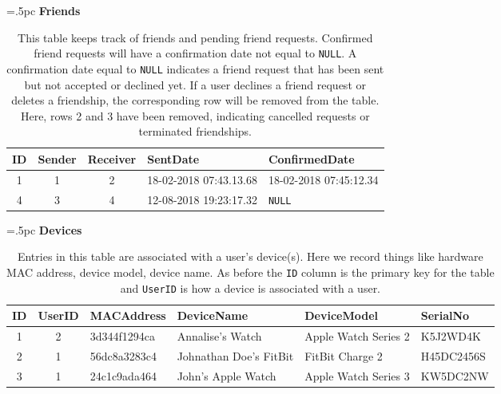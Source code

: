 \documentclass{article}
\theoremstyle{definition}
\begin{document}
\begin{table}[H]
	\centering
	\tabcolsep=.5pc
	{\bf Friends}
	
	\begin{tabular}{cccll} \hline 
		ID & Sender & Receiver & SentDate & ConfirmedDate \\ \hline 
		1 & 1 & 2 & 18-02-2018 07:43.13.68 & 18-02-2018 07:45:12.34 \\
		4 & 3 & 4 & 12-08-2018 19:23:17.32 & {\tt NULL} \\
		\hline 
	\end{tabular}
	\caption{\label{tab:friends}
		This table keeps track of friends and pending friend requests. Confirmed friend requests will have a confirmation date not equal to {\tt NULL}. A confirmation date equal to {\tt NULL} indicates a friend request that has been sent but not accepted or declined yet. If a user declines a friend request or deletes a friendship, the corresponding row will be removed from the table. Here, rows 2 and 3 have been removed, indicating cancelled requests or terminated friendships.
	}
\end{table}

\begin{sidewaystable}[h]
	\centering
	\tabcolsep=.5pc
	{\bf Devices}
	
	\begin{tabular}{ccllll} \hline 
		ID & UserID & MACAddress & DeviceName & DeviceModel & SerialNo \\ \hline  
		1 & 2 & 3d344f1294ca & Annalise's Watch & Apple Watch Series 2 & K5J2WD4K \\
		2 & 1 & 56dc8a3283c4 & Johnathan Doe's FitBit & FitBit Charge 2 & H45DC2456S \\
		3 & 1 & 24c1c9ada464 & John's Apple Watch & Apple Watch Series 3 & KW5DC2NW \\ 
		\hline 
	\end{tabular}
	\caption{\label{tab:device}
		Entries in this table are associated with a user's device(s). Here we record things like hardware MAC address, device model, device name. As before the {\tt ID} column is the primary key for the table and {\tt UserID} is how a device is associated with a user. 
	}
\end{sidewaystable}
\end{document}
